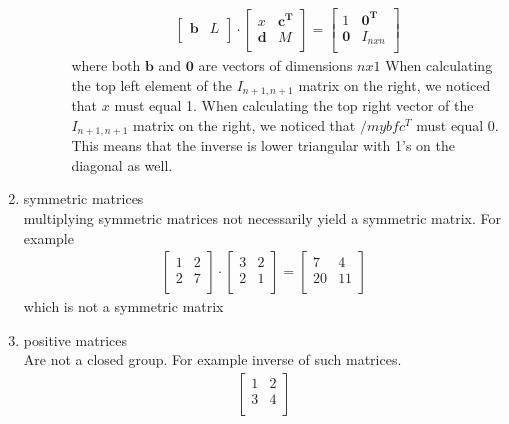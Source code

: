 \documentclass[a4paper,11pt]{article}
\newcommand{\mybf}[1]{\boldsymbol{#1}}
\begin{document}
\begin{enumerate}
\begin{enumerate}
\begin{enumerate}
\begin{align}
\begin{bmatrix}
\mybf{b} & L         \\
\end{bmatrix}
\cdot
\begin{bmatrix}
x        & \mybf{c^T}\\
\mybf{d} & M         \\
\end{bmatrix}
=
\begin{bmatrix}
1        & \mybf{0^T}\\
\mybf{0} & I_{nxn}         \\
\end{bmatrix}
\end{align}
where both $\mybf{b}$ and $\mybf{0}$ are vectors of dimensions $nx1$ 
When calculating the top left element of the $I_{n+1,n+1}$ matrix on the right, we noticed that $x$ must equal 1.
When calculating the top right vector of the $I_{n+1,n+1}$ matrix on the right, we noticed that $/mybf{c^T}$ must equal 0.
This means that the inverse is lower triangular with 1's on the diagonal as well.
\end{enumerate}
\end{enumerate}
\item symmetric matrices\\
multiplying symmetric matrices not necessarily yield a symmetric matrix. For example
\begin{align}
\begin{bmatrix}
1 & 2\\
2 & 7\\
\end{bmatrix}
\cdot
\begin{bmatrix}
3 & 2\\
2 & 1\\
\end{bmatrix}
=
\begin{bmatrix}
7 & 4\\
20 & 11 \\
\end{bmatrix}
\end{align}
which is not a symmetric matrix
\item positive matrices\\
Are not a closed group. For example inverse of such matrices.
\begin{align}
\begin{bmatrix}
1 & 2\\
3 & 4\\
\end{bmatrix}
\end{align}

\end{enumerate}
\end{document}
